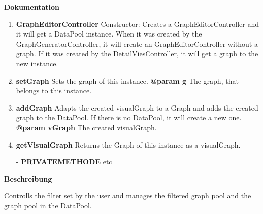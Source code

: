 \textbf{Dokumentation}
\begin{enumerate}[+]
	\item{
	\textbf{GraphEditorController} \newline
	Constructor: Creates a GraphEditorController and it will get a DataPool instance. When it was created by the GraphGeneratorController, it will create an GraphEditorController without a graph. \newline
	If it was created by the DetailViesController, it will get a graph to the new instance. \newline
}
	\item{
	\textbf{setGraph} \newline
	Sets the graph of this instance. \newline
	\textbf{@param g} The graph, that belongs to this instance.\newline
}

	\item{
	\textbf{addGraph} \newline
	Adapts the created visualGraph to a Graph and adds the created graph to the DataPool. If there is no DataPool, it will create a new one. \newline
	\textbf{@param vGraph} The created visualGraph. \newline
}
	\item{
	\textbf{getVisualGraph} \newline
	Returns the Graph of this instance as a visualGraph. \newline
}
	\item[-]{
		\textbf{PRIVATEMETHODE} etc
	}
\end{enumerate}

\textbf{Beschreibung}

Controlls the filter set by the user and manages the filtered graph pool and the graph pool in the DataPool. \newline

